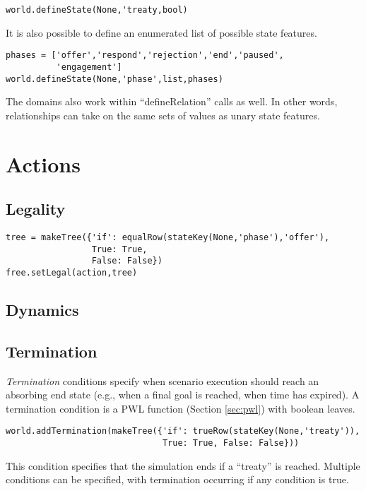 \documentclass{book}
\begin{document}
\begin{verbatim}
world.defineState(None,'treaty,bool)
\end{verbatim}

It is also possible to define an enumerated list of possible state features.

\begin{verbatim}
phases = ['offer','respond','rejection','end','paused',
          'engagement']
world.defineState(None,'phase',list,phases)
\end{verbatim}

The domains also work within ``defineRelation'' calls as well. In other words, relationships can take on the same sets of values as unary state features.
\section{Actions}

\subsection{Legality}

\begin{verbatim}
tree = makeTree({'if': equalRow(stateKey(None,'phase'),'offer'),
                 True: True,    
                 False: False})
free.setLegal(action,tree)
\end{verbatim}

\subsection{Dynamics}

\subsection{Termination}

{\em Termination} conditions specify when scenario execution should reach an absorbing end state (e.g., when a final goal is reached, when time has expired). A termination condition is a PWL function (Section \ref{sec:pwl}) with boolean leaves.

\begin{verbatim}
world.addTermination(makeTree({'if': trueRow(stateKey(None,'treaty')),
                               True: True, False: False}))
\end{verbatim}

This condition specifies that the simulation ends if a ``treaty'' is reached. Multiple conditions can be specified, with termination occurring if any condition is true.
\end{document}
